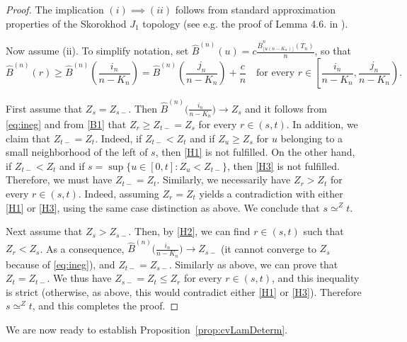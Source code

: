 \documentclass[10pt]{amsart}
\theoremstyle{definition}\newtheorem{defi}[theo]{Definition}\newtheorem{rema}[theo]{Remark}\newtheorem{exam}[theo]{Example}\newtheorem{exem}[theo]{Example}\newtheorem{nota}[theo]{Notation}
\def\oB{\overline{B}}
\def\hB{\widehat{B}}
\begin{document}
\begin{proof}
The implication $(i) \implies (ii)$ follows from standard approximation properties of the Skorokhod $J_{1}$ topology (see e.g. the proof of Lemma 4.6. in \cite{KM17}).

Now assume (ii). To simplify notation, set $ \hB^{(n)}(u)=c \tfrac{\oB^{n}_{\lfloor u (n-K_{n}) \rfloor}(T_n)}{ n}$, so that
\begin{equation}
\label{eq:ineg} \hB^{(n)}(r) \geq \hB^{(n)} \left(  \frac{i_{n}}{n-K_{n}} \right) =\hB^{(n)} \left(  \frac{j_{n}}{n-K_{n}} \right)+ \frac{c}{n}  \quad \textrm{for every } r \in \left[  \frac{i_{n}}{n-K_{n}}, \frac{j_{n}}{n-K_{n}}  \right).
\end{equation}

First assume that  $Z_{s}=Z_{s-}$.
Then $\hB^{(n)} \big(  \tfrac{i_{n}}{n-K_{n}} \big) \rightarrow Z_{s}$
and it follows from \eqref{eq:ineg} and from \ref{B1} that  $Z_r \ge Z_{t-}=Z_{s}$ for every $r \in (s,t)$.
In addition, we claim that $Z_{t-}=Z_{t}$.
Indeed, if $Z_{t-}<Z_{t}$ and if $Z_{u}\geq Z_{s}$ for $u$ belonging to a small neighborhood of the left of $s$,
then \ref{H1} is not fulfilled.
On the other hand, if $Z_{t-}<Z_{t}$ and if $s=\sup\{ u \in [0,t] : Z_{u} < Z_{t-}\}$, then \ref{H3}
is not fulfilled.
Therefore, we must have $Z_{t-}=Z_{t}$.
Similarly, we necessarily have $Z_{r}>Z_{t}$ for every $r \in (s,t)$.
Indeed, assuming $Z_r=Z_t$ yields a contradiction with either \ref{H1} or \ref{H3},
using the same case distinction as above.
We conclude that $s \simeq^Z t$.

Next assume that $Z_{s}>Z_{s-}$. Then, by \ref{H2}, we can find $r \in (s,t)$ such that $Z_{r}<Z_{s}$.
As a consequence,  $\hB^{(n)} \big(  \tfrac{i_{n}}{n-K_{n}} \big) \rightarrow Z_{s-}$
(it cannot converge to $Z_s$ because of \eqref{eq:ineg}), and $Z_{t-}=Z_{s-}$.
Similarly as above, we can prove that $Z_{t}=Z_{t-}$.
We thus have $Z_{s-}=Z_{t} \leq Z_{r}$ for every $r \in (s,t)$,
and this inequality is strict (otherwise, as above, this would contradict either \ref{H1} or \ref{H3}).
Therefore $s \simeq^Z t$, and this completes the proof.
\end{proof}

We are now ready to establish Proposition~\ref{prop:cvLamDeterm}.
\end{document}
